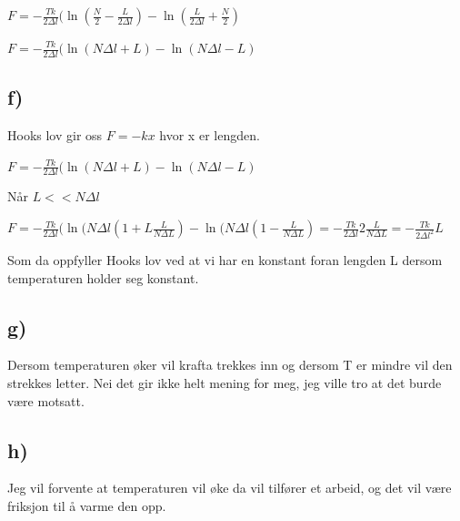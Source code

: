 \documentclass[12pt]{article}
\begin{document}
$ F = -\frac{Tk}{2\Delta l}(\ln(\frac{N}{2} -\frac{L}{2\Delta l}) -\ln (\frac{L}{2\Delta l} + \frac{N}{2})$

$F = -\frac{Tk}{2\Delta l}(\ln (N\Delta l +L) - \ln (N\Delta l- L)$

\subsection*{f)}


Hooks lov gir oss $F = -kx$ hvor x er lengden.

$F = -\frac{Tk}{2\Delta l}(\ln (N\Delta l +L) - \ln (N\Delta l- L)$

Når $L<<N\Delta l$

$F = -\frac{Tk}{2\Delta l}(\ln (N\Delta l(1 +L\frac{L}{N\Delta L}) - \ln (N\Delta l(1- \frac{L}{N\Delta L}) = -\frac{Tk}{2\Delta l}2\frac{L}{N\Delta L} =  -\frac{Tk}{2\Delta l^2}L$

Som da oppfyller Hooks lov ved at vi har en konstant foran lengden L dersom temperaturen holder seg konstant. 

\subsection*{g)}

Dersom temperaturen øker vil krafta trekkes inn og dersom T er mindre vil den strekkes letter. Nei det gir ikke helt mening for meg, jeg ville tro at det burde være motsatt. 

\subsection*{h)}
Jeg vil forvente at temperaturen vil øke da vil tilfører et arbeid, og det vil være friksjon til å varme den opp. 
\end{document}
